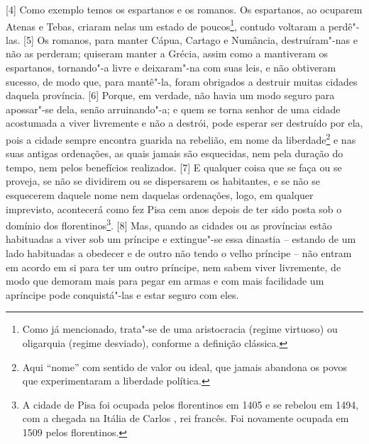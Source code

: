 {[}4{]} Como exemplo temos os espartanos e os romanos. Os espartanos, ao
ocuparem Atenas e Tebas, criaram nelas um estado de poucos\footnote{Como
  já mencionado, trata"-se de uma aristocracia (regime virtuoso) ou
  oligarquia (regime desviado), conforme a definição clássica.}, contudo
voltaram a perdê"-las. {[}5{]} Os romanos, para manter Cápua, Cartago e
Numância, destruíram"-nas e não as perderam; quiseram manter a Grécia,
assim como a mantiveram os espartanos, tornando"-a livre e deixaram"-na
com suas leis, e não obtiveram sucesso, de modo que, para mantê"-la,
foram obrigados a destruir muitas cidades daquela província. {[}6{]}
Porque, em verdade, não havia um modo seguro para apossar"-se dela, senão
arruinando"-a; e quem se torna senhor de uma cidade acostumada a viver
livremente e não a destrói, pode esperar ser destruído por ela, pois a
cidade sempre encontra guarida na rebelião, em nome da
liberdade\footnote{Aqui ``nome'' com sentido de valor ou ideal, que
  jamais abandona os povos que experimentaram a liberdade política.} e
nas suas antigas ordenações, as quais jamais são esquecidas, nem pela
duração do tempo, nem pelos benefícios realizados. {[}7{]} E qualquer
coisa que se faça ou se proveja, se não se dividirem ou se dispersarem
os habitantes, e se não se esquecerem daquele nome nem daquelas
ordenações, logo, em qualquer imprevisto, acontecerá como fez Pisa cem
anos depois de ter sido posta sob o domínio dos florentinos\footnote{A
  cidade de Pisa foi ocupada pelos florentinos em 1405 e se rebelou em
  1494, com a chegada na Itália de Carlos , rei francês. Foi
  novamente ocupada em 1509 pelos florentinos.}. {[}8{]} Mas, quando as
cidades ou as províncias estão habituadas a viver sob um príncipe e
extingue"-se essa dinastia -- estando de um lado habituadas a obedecer e
de outro não tendo o velho príncipe -- não entram em acordo em si para
ter um outro príncipe, nem sabem viver livremente, de modo que demoram
mais para pegar em armas e com mais facilidade um apríncipe pode
conquistá"-las e estar seguro com eles.

